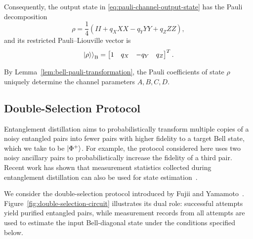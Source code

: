 Consequently, the output state in
\eqref{eq:pauli-channel-output-state} has the Pauli decomposition
\begin{equation}
    \rho
    =
    \frac{1}{4}
    \left(
    I I
    +q_X X X
    -q_Y Y Y
    +q_Z Z Z
    \right),
    \label{eq:pauli-channel-output-expansion}
\end{equation}
and its restricted Pauli--Liouville vector is
\begin{equation}
    \left. \left|\rho\right\rangle \right \rangle_{\mathrm B}
    =
    \begin{bmatrix}
        1 & q_X & -q_Y & q_Z
    \end{bmatrix}^{T}.
    \label{eq:pauli-channel-output-vector}
\end{equation}


By Lemma~\ref{lem:bell-pauli-transformation}, the Pauli coefficients
of state $\rho$ uniquely determine the channel parameters
\(A,B,C,D\).


\subsection{Double-Selection Protocol}
\label{doub}\label{subsec:doub}

Entanglement distillation aims to  probabilistically
 transform multiple copies of a noisy
entangled pairs into  fewer pairs with higher fidelity to a target Bell
state, which we take to be $\ket{\Phi^+}$.
For example, the protocol considered here uses two noisy ancillary
pairs to probabilistically increase the fidelity of a third pair.
Recent work has shown that measurement statistics collected during
entanglement distillation can also be used for state
estimation~\cite{Casapao_2025}.

We consider the double-selection protocol introduced by Fujii and
Yamamoto~\cite{PhysRevA.80.042308}.
Figure~\ref{fig:double-selection-circuit} illustrates its dual role:
successful attempts yield purified entangled pairs, while measurement
records from all attempts are used to estimate the input
Bell-diagonal state under the conditions specified below.


